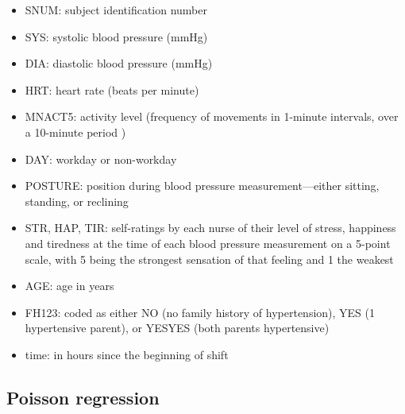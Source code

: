 \documentclass[11pt]{article}
\begin{document}
 \begin{itemize}
\item SNUM: subject identification number
\item SYS: systolic blood pressure (mmHg)
\item DIA: diastolic blood pressure (mmHg)
\item HRT: heart rate (beats per minute)
\item MNACT5: activity level (frequency of movements in 1-minute intervals, over a 10-minute period )
\item DAY: workday or non-workday
\item POSTURE: position during blood pressure measurement—either sitting, standing, or reclining
\item STR, HAP, TIR: self-ratings by each nurse of their level of stress, happiness and tiredness at the time of each blood pressure measurement on a 5-point scale, with 5 being the strongest sensation of that feeling and 1 the weakest
\item AGE: age in years
\item FH123: coded as either NO (no family history of hypertension), YES (1 hypertensive parent), or YESYES (both parents hypertensive)
\item time: in hours since the beginning of shift
\end{itemize}

\newpage

\subsection{Poisson regression}
\end{document}
